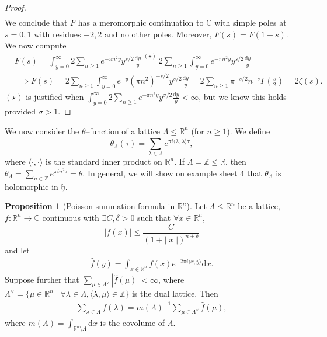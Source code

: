 \documentclass{article}
\theoremstyle{definition}
\newtheorem{prop}[theorem]{Proposition}
\begin{document}
\begin{proof}
\begin{align*}
    \end{align*}
    We conclude that $F$ has a meromorphic continuation to $\mathbb{C}$ with simple poles at $s=0,1$ with residues $-2,2$ and no other poles. Moreover, $F(s)=F(1-s)$. We now compute 
    \begin{align*}
        &F(s) = \int_{y=0}^{\infty} 2 \sum_{n\ge 1}^{} e^{-\pi n^2 y}y^{s/2}\frac{\mathrm{d}y}{y} \stackrel{(\star)}{=} 2 \sum_{n\ge 1}^{} \int_{y=0}^{\infty} e^{- \pi n^2 y}y^{s/2}\frac{\mathrm{d}y}{y} \\
        &\implies F(s) = 2\sum_{n\ge 1}^{} \int_{y=0}^{\infty} e^{-y}(\pi n^2)^{-s/2}y^{s/2}\frac{\mathrm{d}y}{y} = 2 \sum_{n\ge 1}^{} \pi^{-s/2}n^{-s}\Gamma \left(\frac{s}{2}\right) = 2 \zeta(s).
    \end{align*}
    $(\star)$ is justified when $\int_{y=0}^{\infty}2\sum_{n\ge 1}^{} e^{-\pi n^2 y}y^{\sigma/2}\frac{\mathrm{d}y}{y}<\infty$, but we know this holds provided $\sigma>1$.
\end{proof}
We now consider the $\theta$--function of a lattice $\Lambda \le \mathbb{R}^n$ (for $n\ge 1$). We define \[
\theta_{\Lambda}(\tau) = \sum_{ \lambda \in \Lambda}^{} e^{\pi i \langle \lambda, \lambda \rangle \tau},
\]
where $\langle \cdot , \cdot  \rangle$ is the standard inner product on $\mathbb{R}^n$. If $\Lambda = \mathbb{Z} \le \mathbb{R}$, then $\theta_{\Lambda} = \sum_{n \in \mathbb{Z}}^{} e^{\pi i n^2 \tau} = \theta$. In general, we will show on example sheet 4 that $\theta_\Lambda$ is holomorphic in $\mathfrak{h}$.
\begin{prop}[Poisson summation formula in $\mathbb{R}^n$]
    Let $\Lambda \le \mathbb{R}^n$ be a lattice, $f : \mathbb{R}^n \to \mathbb{C}$ continuous with $\exists C, \delta>0$ such that $\forall x \in \mathbb{R}^n$, $$|f(x)|\le \frac{C}{(1+||x||)^{n+\delta}}$$ and let \begin{align*}
        \hat{f}(y) = \int_{x \in \mathbb{R}^n}^{} f(x)e^{-2\pi i \langle x, y \rangle}\mathrm{d}x.
    \end{align*}
    Suppose further that $\sum_{\mu \in \Lambda^{\vee}}^{} |\hat{f}(\mu)|<\infty$, where $\Lambda^\vee = {\{\mu \in \mathbb{R}^n \mid \forall \lambda \in \Lambda, \langle \lambda, \mu \rangle \in \mathbb{Z}\}}$ is the dual lattice. Then 
    \begin{align*}
        \sum_{ \lambda \in \Lambda}^{} f(\lambda) = m(\Lambda)^{-1} \sum_{\mu \in \Lambda^{\vee}} \hat{f}(\mu),
    \end{align*}
    where $m(\Lambda) = \int_{\mathbb{R}^n \setminus \Lambda}^{} \mathrm{d}x$ is the covolume of $\Lambda$.
\end{prop}
\end{document}
